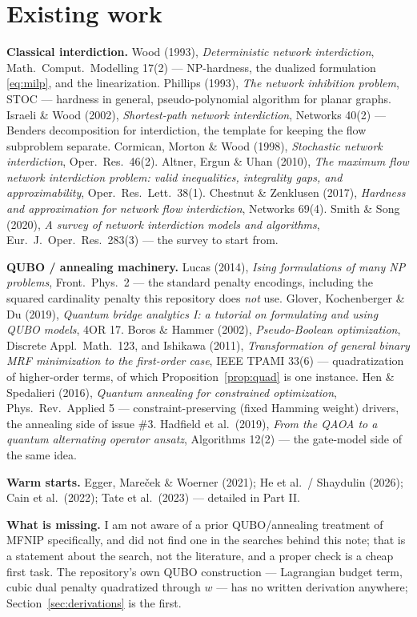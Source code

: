 \documentclass[11pt]{article}
\begin{document}
\section{Existing work}

\textbf{Classical interdiction.} Wood (1993), \emph{Deterministic network interdiction}, Math.\ Comput.\ Modelling 17(2) --- NP-hardness, the dualized formulation \eqref{eq:milp}, and the linearization. Phillips (1993), \emph{The network inhibition problem}, STOC --- hardness in general, pseudo-polynomial algorithm for planar graphs. Israeli \& Wood (2002), \emph{Shortest-path network interdiction}, Networks 40(2) --- Benders decomposition for interdiction, the template for keeping the flow subproblem separate. Cormican, Morton \& Wood (1998), \emph{Stochastic network interdiction}, Oper.\ Res.\ 46(2). Altner, Ergun \& Uhan (2010), \emph{The maximum flow network interdiction problem: valid inequalities, integrality gaps, and approximability}, Oper.\ Res.\ Lett.\ 38(1). Chestnut \& Zenklusen (2017), \emph{Hardness and approximation for network flow interdiction}, Networks 69(4). Smith \& Song (2020), \emph{A survey of network interdiction models and algorithms}, Eur.\ J.\ Oper.\ Res.\ 283(3) --- the survey to start from.

\textbf{QUBO / annealing machinery.} Lucas (2014), \emph{Ising formulations of many NP problems}, Front.\ Phys.\ 2 --- the standard penalty encodings, including the squared cardinality penalty this repository does \emph{not} use. Glover, Kochenberger \& Du (2019), \emph{Quantum bridge analytics I: a tutorial on formulating and using QUBO models}, 4OR 17. Boros \& Hammer (2002), \emph{Pseudo-Boolean optimization}, Discrete Appl.\ Math.\ 123, and Ishikawa (2011), \emph{Transformation of general binary MRF minimization to the first-order case}, IEEE TPAMI 33(6) --- quadratization of higher-order terms, of which Proposition~\ref{prop:quad} is one instance. Hen \& Spedalieri (2016), \emph{Quantum annealing for constrained optimization}, Phys.\ Rev.\ Applied 5 --- constraint-preserving (fixed Hamming weight) drivers, the annealing side of issue \#3. Hadfield et al.\ (2019), \emph{From the QAOA to a quantum alternating operator ansatz}, Algorithms 12(2) --- the gate-model side of the same idea.

\textbf{Warm starts.} Egger, Mare\v{c}ek \& Woerner (2021); He et al.\ / Shaydulin (2026); Cain et al.\ (2022); Tate et al.\ (2023) --- detailed in Part II.

\textbf{What is missing.} I am not aware of a prior QUBO/annealing treatment of MFNIP specifically, and did not find one in the searches behind this note; that is a statement about the search, not the literature, and a proper check is a cheap first task. The repository's own QUBO construction --- Lagrangian budget term, cubic dual penalty quadratized through $w$ --- has no written derivation anywhere; Section~\ref{sec:derivations} is the first.
\end{document}
